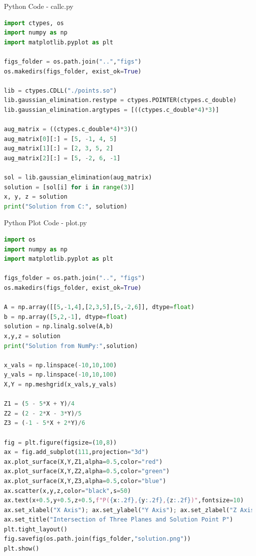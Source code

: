 \documentclass{beamer}
\numberwithin{equation}{section}
\begin{document}
\begin{frame}[fragile]{Python Code - callc.py }
\begin{lstlisting}[language=Python]
import ctypes, os
import numpy as np
import matplotlib.pyplot as plt

figs_folder = os.path.join("..","figs")
os.makedirs(figs_folder, exist_ok=True)

lib = ctypes.CDLL("./points.so")
lib.gaussian_elimination.restype = ctypes.POINTER(ctypes.c_double)
lib.gaussian_elimination.argtypes = [((ctypes.c_double*4)*3)]

aug_matrix = ((ctypes.c_double*4)*3)()
aug_matrix[0][:] = [5, -1, 4, 5]
aug_matrix[1][:] = [2, 3, 5, 2]
aug_matrix[2][:] = [5, -2, 6, -1]

sol = lib.gaussian_elimination(aug_matrix)
solution = [sol[i] for i in range(3)]
x, y, z = solution
print("Solution from C:", solution)
\end{lstlisting}
\end{frame}

\begin{frame}[fragile]{Python Plot Code - plot.py}
\begin{lstlisting}[language=Python]
import os
import numpy as np
import matplotlib.pyplot as plt

figs_folder = os.path.join("..", "figs")
os.makedirs(figs_folder, exist_ok=True)

A = np.array([[5,-1,4],[2,3,5],[5,-2,6]], dtype=float)
b = np.array([5,2,-1], dtype=float)
solution = np.linalg.solve(A,b)
x,y,z = solution
print("Solution from NumPy:",solution)

x_vals = np.linspace(-10,10,100)
y_vals = np.linspace(-10,10,100)
X,Y = np.meshgrid(x_vals,y_vals)

Z1 = (5 - 5*X + Y)/4
Z2 = (2 - 2*X - 3*Y)/5
Z3 = (-1 - 5*X + 2*Y)/6

fig = plt.figure(figsize=(10,8))
ax = fig.add_subplot(111,projection="3d")
ax.plot_surface(X,Y,Z1,alpha=0.5,color="red")
ax.plot_surface(X,Y,Z2,alpha=0.5,color="green")
ax.plot_surface(X,Y,Z3,alpha=0.5,color="blue")
ax.scatter(x,y,z,color="black",s=50)
ax.text(x+0.5,y+0.5,z+0.5,f"P({x:.2f},{y:.2f},{z:.2f})",fontsize=10)
ax.set_xlabel("X Axis"); ax.set_ylabel("Y Axis"); ax.set_zlabel("Z Axis")
ax.set_title("Intersection of Three Planes and Solution Point P")
plt.tight_layout()
fig.savefig(os.path.join(figs_folder,"solution.png"))
plt.show()
\end{lstlisting}
\end{frame}
\end{document}

